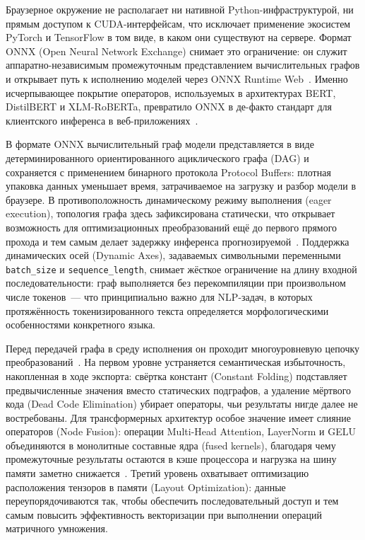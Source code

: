 Браузерное окружение не располагает ни нативной Python-инфраструктурой, ни прямым доступом к CUDA-интерфейсам, что исключает применение экосистем PyTorch и TensorFlow в том виде, в каком они существуют на сервере. Формат ONNX (Open Neural Network Exchange) снимает это ограничение: он служит аппаратно-независимым промежуточным представлением вычислительных графов и открывает путь к исполнению моделей через ONNX Runtime Web~\cite{onnxruntime2024}. Именно исчерпывающее покрытие операторов, используемых в архитектурах BERT, DistilBERT и XLM-RoBERTa, превратило ONNX в де-факто стандарт для клиентского инференса в веб-приложениях~\cite{xu2022survey}.

В формате ONNX вычислительный граф модели представляется в виде детерминированного ориентированного ациклического графа (DAG) и сохраняется с применением бинарного протокола Protocol Buffers: плотная упаковка данных уменьшает время, затрачиваемое на загрузку и разбор модели в браузере. В противоположность динамическому режиму выполнения (eager execution), топология графа здесь зафиксирована статически, что открывает возможность для оптимизационных преобразований ещё до первого прямого прохода и тем самым делает задержку инференса прогнозируемой~\cite{wang2024anatomizing}. Поддержка динамических осей (Dynamic Axes), задаваемых символьными переменными \texttt{batch\_size} и \texttt{sequence\_length}, снимает жёсткое ограничение на длину входной последовательности: граф выполняется без перекомпиляции при произвольном числе токенов~--- что принципиально важно для NLP-задач, в которых протяжённость токенизированного текста определяется морфологическими особенностями конкретного языка.

Перед передачей графа в среду исполнения он проходит многоуровневую цепочку преобразований~\cite{onnxruntime2024}. На первом уровне устраняется семантическая избыточность, накопленная в ходе экспорта: свёртка констант (Constant Folding) подставляет предвычисленные значения вместо статических подграфов, а удаление мёртвого кода (Dead Code Elimination) убирает операторы, чьи результаты нигде далее не востребованы. Для трансформерных архитектур особое значение имеет слияние операторов (Node Fusion): операции Multi-Head Attention, LayerNorm и GELU объединяются в монолитные составные ядра (fused kernels), благодаря чему промежуточные результаты остаются в кэше процессора и нагрузка на шину памяти заметно снижается~\cite{jia2024empowering}. Третий уровень охватывает оптимизацию расположения тензоров в памяти (Layout Optimization): данные переупорядочиваются так, чтобы обеспечить последовательный доступ и тем самым повысить эффективность векторизации при выполнении операций матричного умножения.

